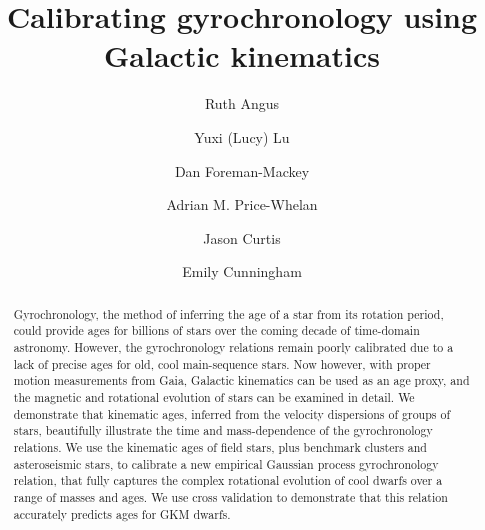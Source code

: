 \documentclass{aastex63}
\begin{document}
\title{Calibrating gyrochronology using Galactic kinematics}


\author{Ruth Angus}

\author{Yuxi (Lucy) Lu}

\author{Dan Foreman-Mackey}

\author{Adrian M. Price-Whelan}

\author{Jason Curtis}

\author{Emily Cunningham}

\begin{abstract}
Gyrochronology, the method of inferring the age of a star from its rotation
period, could provide ages for billions of stars over the coming decade of
time-domain astronomy.
However, the gyrochronology relations remain poorly calibrated due to a lack
of precise ages for old, cool main-sequence stars.
Now however, with proper motion measurements from Gaia, Galactic kinematics
can be used as an age proxy, and the magnetic and rotational evolution of
stars can be examined in detail.
We demonstrate that kinematic ages, inferred from the velocity dispersions of
groups of stars, beautifully illustrate the time and mass-dependence of the
gyrochronology relations.
We use the kinematic ages of field stars, plus benchmark clusters and
    asteroseismic stars, to calibrate a new empirical Gaussian process
    gyrochronology relation, that fully captures the complex rotational
    evolution of cool dwarfs over a range of masses and ages.
We use cross validation to demonstrate that this relation accurately predicts
ages for GKM dwarfs.
\end{abstract}














{}

\end{document}
